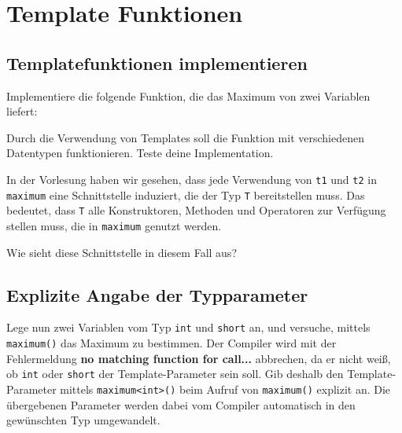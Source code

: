 \section{Template Funktionen}
\subsection{Templatefunktionen implementieren}
Implementiere die folgende Funktion, die das Maximum von zwei Variablen liefert:



Durch die Verwendung von Templates soll die Funktion mit verschiedenen Datentypen funktionieren.
Teste deine Implementation.

In der Vorlesung haben wir gesehen, dass jede Verwendung von \lstinline{t1} und \lstinline{t2} in \lstinline{maximum} eine Schnittstelle induziert, die der Typ \lstinline{T} bereitstellen muss.
Das bedeutet, dass \lstinline{T} alle Konstruktoren, Methoden und Operatoren zur Verfügung stellen muss, die in \lstinline{maximum} genutzt werden.

Wie sieht diese Schnittstelle in diesem Fall aus?


\subsection{Explizite Angabe der Typparameter}
Lege nun zwei Variablen vom Typ \lstinline{int} und \lstinline{short} an, und versuche, mittels \lstinline{maximum()} das Maximum zu bestimmen.
Der Compiler wird mit der Fehlermeldung \textbf{no matching function for call...} abbrechen, da er nicht weiß, ob \lstinline{int} oder \lstinline{short} der Template-Parameter sein soll.
Gib deshalb den Template-Parameter mittels \lstinline{maximum<int>()} beim Aufruf von \lstinline{maximum()} explizit an.
Die übergebenen Parameter werden dabei vom Compiler automatisch in den gewünschten Typ umgewandelt.

